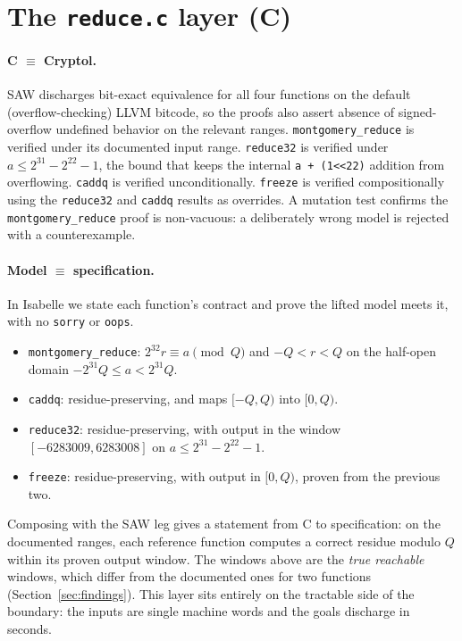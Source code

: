 \documentclass[11pt]{article}
\newcommand{\code}[1]{\texttt{#1}}
\begin{document}
\section{The \code{reduce.c} layer (C)}\label{sec:reduce}

\paragraph{C $\equiv$ Cryptol.} SAW discharges bit-exact equivalence for all four functions on the
default (overflow-checking) LLVM bitcode, so the proofs also assert absence of signed-overflow undefined
behavior on the relevant ranges. \code{montgomery\_reduce} is verified under its documented input range.
\code{reduce32} is verified under $a \le 2^{31} - 2^{22} - 1$, the bound that keeps the internal
\code{a + (1{<}{<}22)} addition from overflowing. \code{caddq} is verified unconditionally. \code{freeze}
is verified compositionally using the \code{reduce32} and \code{caddq} results as overrides. A mutation
test confirms the \code{montgomery\_reduce} proof is non-vacuous: a deliberately wrong model is rejected
with a counterexample.

\paragraph{Model $\equiv$ specification.} In Isabelle we state each function's contract and prove the
lifted model meets it, with no \code{sorry} or \code{oops}.
\begin{itemize}
  \item \code{montgomery\_reduce}: $2^{32} r \equiv a \pmod Q$ and $-Q < r < Q$ on the half-open domain
  $-2^{31} Q \le a < 2^{31} Q$.
  \item \code{caddq}: residue-preserving, and maps $[-Q, Q)$ into $[0, Q)$.
  \item \code{reduce32}: residue-preserving, with output in the window $[-6283009, 6283008]$ on
  $a \le 2^{31} - 2^{22} - 1$.
  \item \code{freeze}: residue-preserving, with output in $[0, Q)$, proven from the previous two.
\end{itemize}
Composing with the SAW leg gives a statement from C to specification: on the documented ranges, each
reference function computes a correct residue modulo $Q$ within its proven output window. The
windows above are the \emph{true reachable} windows, which differ from the documented ones for two
functions (Section~\ref{sec:findings}). This layer sits entirely on the tractable side of the boundary:
the inputs are single machine words and the goals discharge in seconds.
\end{document}
